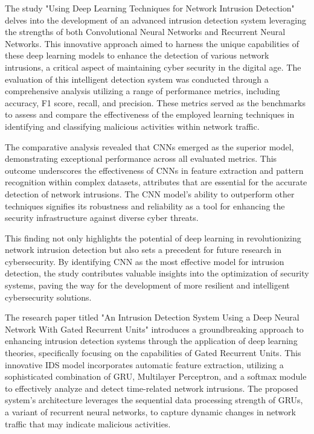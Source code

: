 The study "Using Deep Learning Techniques for Network Intrusion Detection" delves into the development of an advanced intrusion detection system leveraging the strengths of both Convolutional Neural Networks and Recurrent Neural Networks. This innovative approach aimed to harness the unique capabilities of these deep learning models to enhance the detection of various network intrusions, a critical aspect of maintaining cyber security in the digital age. The evaluation of this intelligent detection system was conducted through a comprehensive analysis utilizing a range of performance metrics, including accuracy, F1 score, recall, and precision. These metrics served as the benchmarks to assess and compare the effectiveness of the employed learning techniques in identifying and classifying malicious activities within network traffic.\par
The comparative analysis revealed that CNNs emerged as the superior model, demonstrating exceptional performance across all evaluated metrics. This outcome underscores the effectiveness of CNNs in feature extraction and pattern recognition within complex datasets, attributes that are essential for the accurate detection of network intrusions. The CNN model's ability to outperform other techniques signifies its robustness and reliability as a tool for enhancing the security infrastructure against diverse cyber threats.\par 
This finding not only highlights the potential of deep learning in revolutionizing network intrusion detection but also sets a precedent for future research in cybersecurity. By identifying CNN as the most effective model for intrusion detection, the study contributes valuable insights into the optimization of security systems, paving the way for the development of more resilient and intelligent cybersecurity solutions\cite{al2020using}.
\par 
The research paper titled "An Intrusion Detection System Using a Deep Neural Network With Gated Recurrent Units" introduces a groundbreaking approach to enhancing intrusion detection systems through the application of deep learning theories, specifically focusing on the capabilities of Gated Recurrent Units. This innovative IDS model incorporates automatic feature extraction, utilizing a sophisticated combination of GRU, Multilayer Perceptron, and a softmax module to effectively analyze and detect time-related network intrusions. The proposed system's architecture leverages the sequential data processing strength of GRUs, a variant of recurrent neural networks, to capture dynamic changes in network traffic that may indicate malicious activities.\par 
